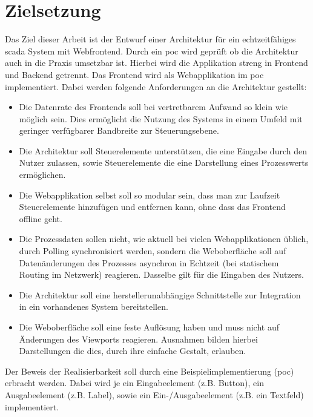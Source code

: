 \section{Zielsetzung}
Das Ziel dieser Arbeit ist der Entwurf einer Architektur für ein
echtzeitfähiges \ac{scada} System mit Webfrontend.
Durch ein \ac{poc} wird geprüft ob die Architektur auch in die Praxis umsetzbar ist.
Hierbei wird die Applikation streng in Frontend und Backend getrennt. Das Frontend wird als Webapplikation im \ac{poc} implementiert.
Dabei werden folgende Anforderungen an die Architektur gestellt:
\begin{itemize}
    \item   Die Datenrate des Frontends soll bei vertretbarem Aufwand so klein wie möglich sein.
            Dies ermöglicht die Nutzung des Systems in einem Umfeld mit geringer verfügbarer Bandbreite zur Steuerungsebene.
    \item   Die Architektur soll Steuerelemente unterstützen, die eine Eingabe durch den Nutzer zulassen, sowie Steuerelemente die eine Darstellung eines Prozesswerts ermöglichen.
    \item   Die Webapplikation selbst soll so modular sein, dass man zur Laufzeit Steuerelemente hinzufügen und entfernen kann, ohne dass das Frontend offline geht.
    \item   Die Prozessdaten sollen nicht, wie aktuell bei vielen Webapplikationen üblich, durch Polling synchronisiert werden, sondern die Weboberfläche soll auf Datenänderungen des Prozesses asynchron in Echtzeit (bei statischem Routing im Netzwerk) reagieren. Dasselbe gilt für die Eingaben des Nutzers.
    \item   Die Architektur soll eine herstellerunabhängige Schnittstelle zur Integration in ein vorhandenes System bereitstellen.
    \item   Die Weboberfläche soll eine feste Auflösung haben und muss nicht auf Änderungen des Viewports reagieren.
            Ausnahmen bilden hierbei Darstellungen die dies, durch ihre einfache Gestalt, erlauben.
\end{itemize}
Der Beweis der Realisierbarkeit soll durch eine Beispielimplementierung (\ac{poc}) erbracht werden.
Dabei wird je ein Eingabeelement (z.B. Button), ein Ausgabeelement (z.B. Label), sowie ein Ein-/Ausgabeelement (z.B. ein Textfeld) implementiert.

